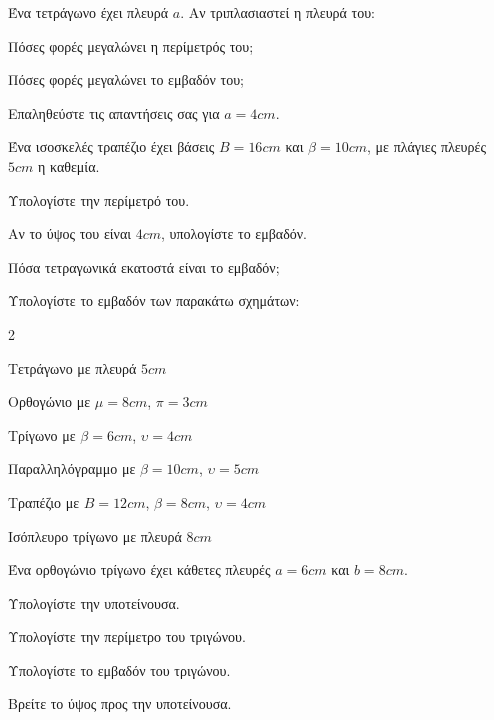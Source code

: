 \documentclass[11pt,a4paper,modern]{FFExercises}
\begin{document}
\askhsh Ένα τετράγωνο έχει πλευρά $a$. Αν τριπλασιαστεί η πλευρά του:
\begin{alist}
\item Πόσες φορές μεγαλώνει η περίμετρός του;
\item Πόσες φορές μεγαλώνει το εμβαδόν του;
\item Επαληθεύστε τις απαντήσεις σας για $a=4\si{cm}$.
\end{alist}

\askhsh Ένα ισοσκελές τραπέζιο έχει βάσεις $B=16\si{cm}$ και $\beta=10\si{cm}$, με πλάγιες πλευρές $5\si{cm}$ η καθεμία.
\begin{alist}
\item Υπολογίστε την περίμετρό του.
\item Αν το ύψος του είναι $4\si{cm}$, υπολογίστε το εμβαδόν.
\item Πόσα τετραγωνικά εκατοστά είναι το εμβαδόν;
\end{alist}

\askhsh Υπολογίστε το εμβαδόν των παρακάτω σχημάτων:
\begin{multicols}{2}
\begin{alist}
\item Τετράγωνο με πλευρά $5\si{cm}$
\item Ορθογώνιο με $\mu=8\si{cm}$, $\pi=3\si{cm}$
\item Τρίγωνο με $\beta=6\si{cm}$, $\upsilon=4\si{cm}$
\item Παραλληλόγραμμο με $\beta=10\si{cm}$, $\upsilon=5\si{cm}$
\item Τραπέζιο με $B=12\si{cm}$, $\beta=8\si{cm}$, $\upsilon=4\si{cm}$
\item Ισόπλευρο τρίγωνο με πλευρά $8\si{cm}$
\end{alist}
\end{multicols}

\askhsh Ένα ορθογώνιο τρίγωνο έχει κάθετες πλευρές $a=6\si{cm}$ και $b=8\si{cm}$.
\begin{alist}
\item Υπολογίστε την υποτείνουσα.
\item Υπολογίστε την περίμετρο του τριγώνου.
\item Υπολογίστε το εμβαδόν του τριγώνου.
\item Βρείτε το ύψος προς την υποτείνουσα.
\end{alist}

\end{document}
